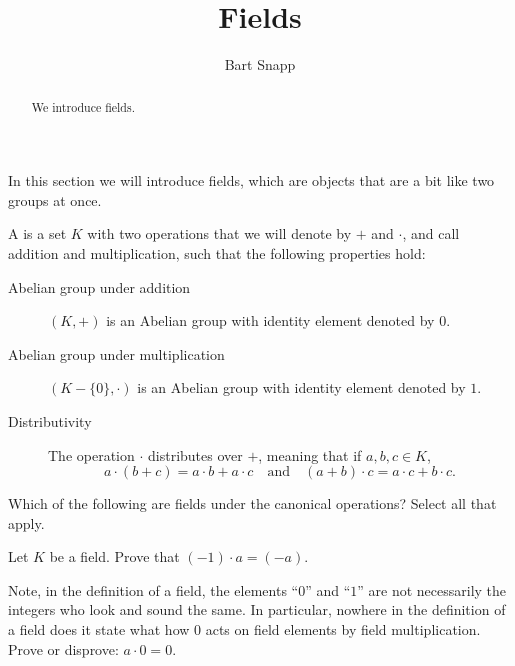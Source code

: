 \documentclass{ximera}
\author{Bart Snapp}
\title{Fields}
\begin{document}
\begin{abstract}
  We introduce fields.
\end{abstract}
\maketitle

In this section we will introduce fields, which are objects that are a
bit like two groups at once.


\begin{definition}
  A  is a set $K$ with two operations that we will denote
  by $+$ and $\cdot$, and call addition and multiplication, such that
  the following properties hold:
  \begin{description}
  \item[Abelian group under addition] $(K,+)$ is an Abelian
    group with identity element denoted by $0$.
  \item[Abelian group under multiplication] $(K-\{0\},\cdot)$ is
    an Abelian group with identity element denoted by $1$.
  \item[Distributivity] The operation $\cdot$ distributes over $+$,
    meaning that if $a,b,c\in K$,
    \[
    a\cdot (b+ c) = a\cdot b+ a\cdot c \quad\text{and}\quad (a+ b)\cdot c  = a\cdot c+ b\cdot c.
    \]
  \end{description}
\end{definition}

\begin{exercise} 
  Which of the following are fields under the canonical operations?
  Select all that apply.
  \begin{selectAll}
    \choice[correct]{$\Q$}
    \choice[correct]{$\R$}
    \choice[correct]{$\C$}
    \choice{$\Z$}
  \end{selectAll}
\end{exercise}

\begin{exercise}
  Let $K$ be a field. Prove that $(-1)\cdot a = (-a)$.
\end{exercise}



\begin{exercise}
  Note, in the definition of a field, the elements ``$0$'' and ``$1$''
  are not necessarily the integers who look and sound the same. In
  particular, nowhere in the definition of a field does it state what
  how $0$ acts on field elements by field multiplication. Prove or
  disprove: $a\cdot 0 = 0$.
\end{exercise}
\end{document}
